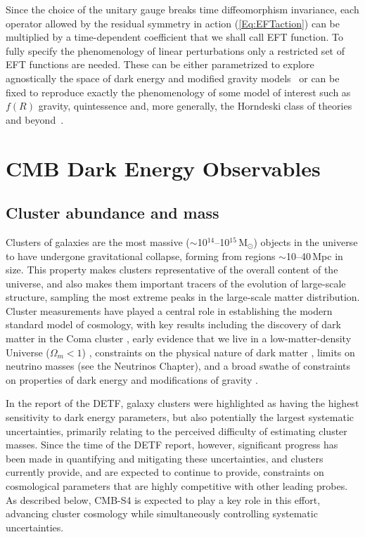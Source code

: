 Since the choice of the unitary gauge breaks time diffeomorphism invariance, each operator allowed by the residual symmetry in action (\ref{Eq:EFTaction}) can be multiplied by a time-dependent coefficient that we shall call EFT function. To fully specify the phenomenology of linear perturbations only a restricted set of EFT functions are needed. These can be either parametrized to explore agnostically the space of dark energy and modified gravity models~\cite{Gleyzes:2013ooa,Bloomfield:2013efa,Piazza:2013coa,Gleyzes:2014rba} or can be fixed to reproduce exactly the phenomenology of some model of interest such as $f(R)$ gravity, quintessence and, more generally, the Horndeski class of theories and beyond~\cite{Gleyzes:2014dya,Frusciante:2015maa,Frusciante:2016xoj}.
%


\section{CMB  Dark Energy Observables}
\label{sec:deobs}

\subsection{Cluster abundance and mass}

Clusters of galaxies are the most massive ($\sim$10$^{14}$--10$^{15}$\,M$_{\odot}$) objects in the universe to have undergone gravitational collapse, forming from regions $\sim$10--40\,Mpc in size.  This property makes clusters representative of the overall content of the universe, and also makes them important tracers of the evolution of large-scale structure, sampling the most extreme peaks in the large-scale matter distribution. Cluster measurements have played a central role in establishing the modern standard model of cosmology, with key results including the discovery of dark matter in the Coma cluster \cite{Zwicky:1933gu}, early evidence that we live in a low-matter-density Universe ($\Omega_m < 1$) \cite{White:1993wm, Donahue:1997sp, Bahcall:1998ur}, constraints on the physical nature of dark matter \cite{Clowe:2006eq}, limits on neutrino masses (see the Neutrinos Chapter), and a broad swathe of constraints on properties of dark energy and modifications of gravity \cite{Vikhlinin:2008ym, Mantz:2009fw, Rapetti:2012bu, Benson:2011uta, Mantz:2014xba, Mantz:2014paa}.

In the report of the DETF, galaxy clusters were highlighted as having the highest sensitivity to dark energy parameters, but also potentially the largest systematic uncertainties, primarily relating to the perceived difficulty of estimating cluster masses. Since the time of the DETF report, however, significant progress has been made in quantifying and mitigating these uncertainties, and clusters currently provide, and are expected to continue to provide, constraints on cosmological parameters that are highly competitive with other leading probes. As described below, CMB-S4 is expected to play a key role in this effort, advancing cluster cosmology while simultaneously controlling systematic uncertainties.

